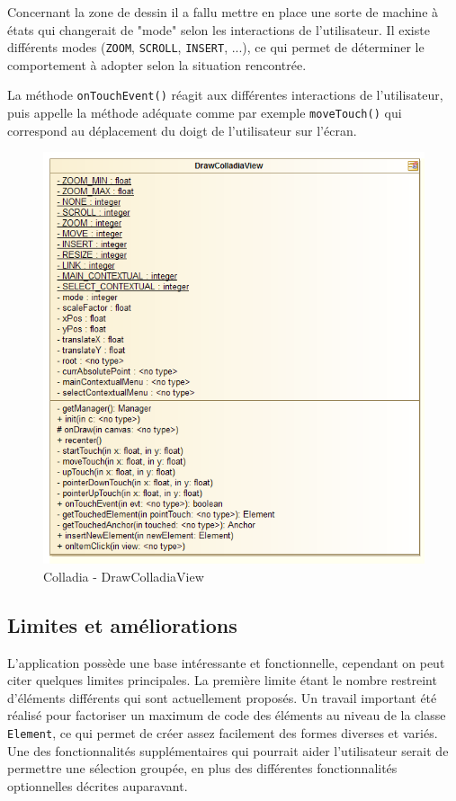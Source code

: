 Concernant la zone de dessin il a fallu mettre en place une sorte de machine à états qui changerait de "mode" selon les interactions de l'utilisateur. Il existe différents modes (\lstinline$ZOOM$, \lstinline$SCROLL$, \lstinline$INSERT$, ...), ce qui permet de déterminer le comportement à adopter selon la situation rencontrée.

La méthode \lstinline$onTouchEvent()$ réagit aux différentes interactions de l'utilisateur, puis appelle la méthode adéquate comme par exemple \lstinline$moveTouch()$ qui correspond au déplacement du doigt de l'utilisateur sur l'écran.  

\newpage
	\begin{figure}[!h]
		\centering
		\includegraphics[width=.8\textwidth]{img/UmlDrawView}
		\caption{Colladia - DrawColladiaView}
	\end{figure}

\subsection{Limites et améliorations}
L'application possède une base intéressante et fonctionnelle, cependant on peut citer quelques limites principales.
La première limite étant le nombre restreint d'éléments différents qui sont actuellement proposés.
Un travail important été réalisé pour factoriser un maximum de code des éléments au niveau de la classe \lstinline$Element$, ce qui permet de créer assez facilement des formes diverses et variés.
Une des fonctionnalités supplémentaires qui pourrait aider l'utilisateur serait de permettre une sélection groupée, en plus des différentes fonctionnalités optionnelles décrites auparavant. 
